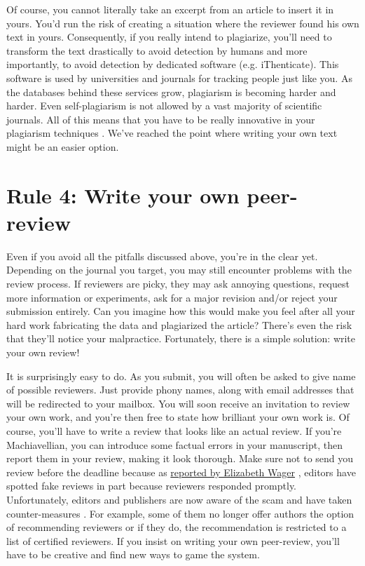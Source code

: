 \documentclass[11pt,letter]{article}
\providecommand\citep{\cite}
\begin{document}
Of course, you cannot literally take an excerpt from an
article to insert it in yours. You'd run the risk of creating a situation where the reviewer found his own text in yours. Consequently, if you
really intend to plagiarize, you'll need to transform the text drastically to
avoid detection by humans \citep{dorigo:2015,} and more importantly, to avoid
detection by dedicated software (e.g. iThenticate). This software is used by
universities and journals for tracking people just like you. As the databases behind these services grow, plagiarism is becoming harder and harder. Even
self-plagiarism is not allowed by a vast majority of scientific journals. All of this means that you have to be really innovative in your plagiarism techniques \citep{long:2009}. We've reached the point where writing your own text might be an easier option.

\section*{Rule 4: Write your own peer-review}

Even if you avoid all the pitfalls discussed above, you're in the clear yet. Depending on the
journal you target, you may still encounter problems with the review
process. If reviewers are picky, they may ask annoying questions,
request more information or experiments, ask for a major revision and/or reject your submission entirely. Can you imagine how this would make you feel after all your hard work
fabricating the data and plagiarized the article? There's even the risk that they'll notice your malpractice. Fortunately, there is a simple solution: write your
own review! 

It is surprisingly easy to do. As you submit, you will often be asked to give name of possible reviewers. Just
provide phony names, along with email addresses that will be redirected to
your mailbox. You will soon receive an invitation to review your own work, and you're then
free to state how brilliant your own work is. Of
course, you'll have to write a review that looks like an actual review. If
you're Machiavellian, you can introduce some factual errors in your
manuscript, then report them in your review, making it look thorough. Make sure not to send you review before the deadline because as
\href{https://arstechnica.com/science/2017/04/107-cancer-papers-retracted-due-to-peer-review-fraud/}{reported
  by Elizabeth Wager} \citep{stigbrand:2017}, editors have
spotted fake reviews in part because reviewers responded promptly. Unfortunately, editors and
publishers are now aware of the scam \citep{ferguson:2014} and  have
taken counter-measures \citep{haug:2015}. For example, some of them no longer offer authors the option of recommending reviewers or if they do, the
recommendation is restricted to a list of certified reviewers. If you insist on
writing your own peer-review, you'll have to be creative and find new ways to
game the system.
\end{document}

